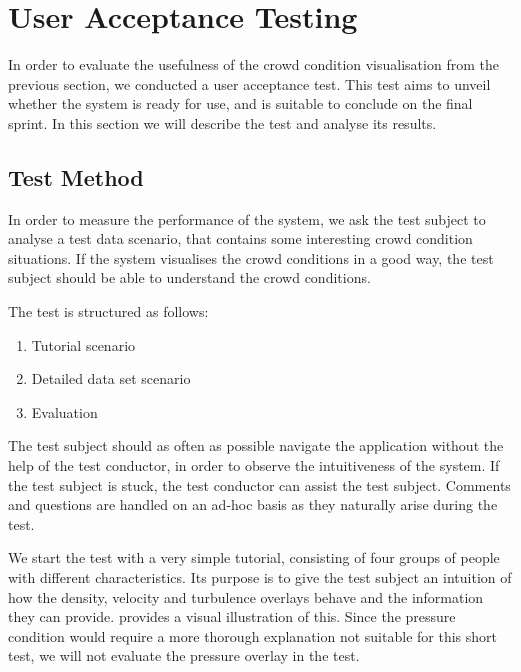 \section{User Acceptance Testing} \label{sec:s4_test}

In order to evaluate the usefulness of the crowd condition visualisation from the previous section, we conducted a user acceptance test. This test aims to unveil whether the system is ready for use, and is suitable to conclude on the final sprint. In this section we will describe the test and analyse its results.

\subsection{Test Method}

In order to measure the performance of the system, we ask the test subject to analyse a test data scenario, that contains some interesting crowd condition situations. If the system visualises the crowd conditions in a good way, the test subject should be able to understand the crowd conditions.

The test is structured as follows:

\begin{enumerate}
    \item Tutorial scenario
    \item Detailed data set scenario
    \item Evaluation
\end{enumerate}

The test subject should as often as possible navigate the application without the help of the test conductor, in order to observe the intuitiveness of the system. If the test subject is stuck, the test conductor can assist the test subject. Comments and questions are handled on an ad-hoc basis as they naturally arise during the test.

We start the test with a very simple tutorial, consisting of four groups of people with different characteristics. Its purpose is to give the test subject an intuition of how the density, velocity and turbulence overlays behave and the information they can provide.  provides a visual illustration of this. Since the pressure condition would require a more thorough explanation not suitable for this short test, we will not evaluate the pressure overlay in the test.

